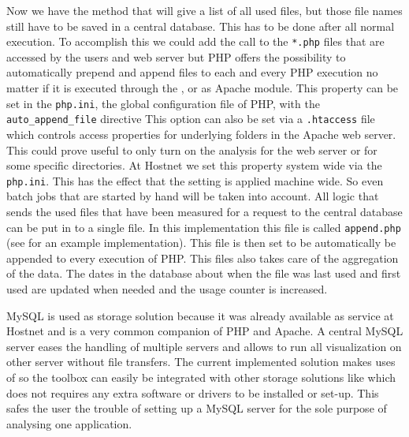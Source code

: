 Now we have the method that will give a list of all used files, but those file names still have to be saved in a central database. This has to be done after all normal execution. To accomplish this we could add the call to the \verb|*.php| files that are accessed by the users and web server but PHP offers the possibility to automatically prepend and append files to each and every PHP execution no matter if it is executed through the \cli, \cgi or as Apache module. This property can be set in the  \verb|php.ini|, the global configuration file of PHP, with the  \verb|auto_append_file| directive This option can also be set via a \verb|.htaccess| file which controls access properties for underlying folders in the Apache web server. This could prove useful to only turn on the analysis for the web server or for some specific directories. At Hostnet we set this property system wide via the \verb|php.ini|. This has the effect that the setting is applied machine wide. So even batch jobs that are started by hand will be taken into account. All logic that sends the used files that have been measured for a request to the central database can be put in to a single file. In this implementation this file is called \verb|append.php| (see  for an example implementation). This file is then set to be automatically be appended to every execution of PHP. This files also takes care of the aggregation of the data. The dates in the database about when the file was last used and first used are updated when needed and the usage counter is increased.

MySQL is used as storage solution because it was already available as service at Hostnet and is a very common companion of PHP and Apache. A central MySQL server eases the handling of multiple servers and allows to run all visualization on other server without file transfers. The current implemented solution makes uses of \pdo so the toolbox can easily be integrated with other storage solutions like  which does not requires any extra software or drivers to be installed or set-up. This safes the user the trouble of setting up a MySQL server for the sole purpose of analysing one application.

